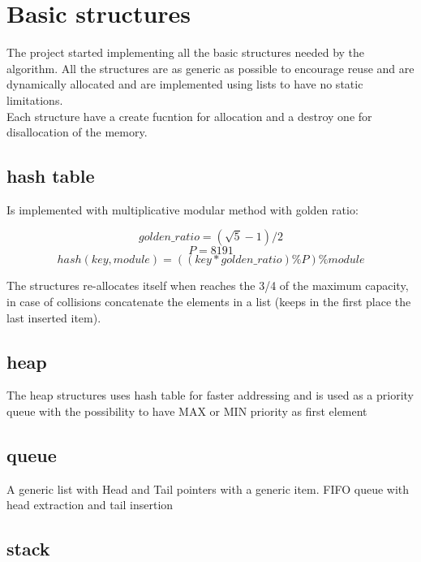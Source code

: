 \section{Basic structures}
\label{Sec:basic_structures}

The project started implementing all the basic structures needed by the algorithm. All the structures are as generic as possible to encourage reuse and are dynamically allocated and are implemented using lists to have no static limitations. \\
Each structure have a create fucntion for allocation and a destroy one for disallocation of the memory.

\subsection{hash table}
\label{hash_table}

Is implemented with multiplicative modular method with golden ratio:

\begin{equation}
    golden\_ratio = (\sqrt{5} - 1)/2
\end{equation}
\begin{equation}
    P = 8191
\end{equation}
\begin{equation}
    hash(key, module) = ((key*golden\_ratio)\%P)\%module
\end{equation}

The structures re-allocates itself when reaches the 3/4 of the maximum capacity, in case of collisions concatenate the elements in a list (keeps in the first place the last inserted item).

\subsection{heap}
\label{heap}

The heap structures uses hash table for faster addressing and is used as a priority queue with the possibility to have MAX or MIN priority as first element

\subsection{queue}

A generic list with Head and Tail pointers with a generic item. FIFO queue with head extraction and tail insertion

\subsection{stack}
\label{stack}

